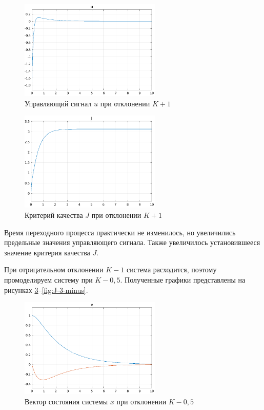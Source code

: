 \documentclass[14pt, a4paper]{extarticle}
\begin{document}
	\begin{figure}[h]
		\centering
		\includegraphics[width=0.6\textwidth]{u-3-plus}
		\caption{Управляющий сигнал $u$ при отклонении $K+1$}
		\label{fig:u-3-plus}
	\end{figure}
	
	\begin{figure}[H]
		\centering
		\includegraphics[width=0.6\textwidth]{J-3-plus}
		\caption{Критерий качества $J$ при отклонении $K+1$}
		\label{fig:J-3-plus}
	\end{figure}
	
	Время переходного процесса практически не изменилось, но увеличились предельные значения управляющего сигнала. Также увеличилось установившееся значение критерия качества $J$.
	
	При отрицательном отклонении $K-1$ система расходится, поэтому промоделируем систему при $K-0,5$. Полученные графики представлены на рисунках \ref{fig:x-3-minus}--\ref{fig:J-3-minus}.

	\begin{figure}[h]
		\centering
		\includegraphics[width=0.6\textwidth]{x-3-minus}
		\caption{Вектор состояния системы $x$ при отклонении $K-0,5$}
		\label{fig:x-3-minus}
	\end{figure}
	
\end{document}
